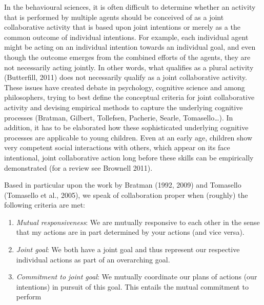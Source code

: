 \documentclass{article}
\begin{document}
In the behavioural sciences, it is often difficult to determine whether an
activity that is performed by multiple agents should be conceived of as a joint
collaborative activity that is based upon joint intentions or merely as a the
common outcome of individual intentions. For example, each individual agent
might be acting on an individual intention towards an individual goal, and even
though the outcome emerges from the combined efforts of the agents, they are
not necessarily acting jointly. In other words, what qualifies as a plural
activity (Butterfill, 2011) does not necessarily qualify as a joint
collaborative activity. These issues have created
debate in psychology, cognitive science and among philosophers, trying to best
define the conceptual criteria for joint collaborative activity and devising
empirical methods to capture the underlying cognitive processes (Bratman,
Gilbert, Tollefsen, Pacherie, Searle, Tomasello{\dots}). In addition, it has to
be elaborated how these sophisticated underlying cognitive processes are
applicable to young children. Even at an early age, children show very
competent social interactions with others, which appear on its face
intentional, joint collaborative action long before these skills can be
empirically demonstrated (for a review see Brownell 2011). 

Based in particular upon the work by Bratman (1992, 2009) and
Tomasello (Tomasello et al., 2005), we speak of collaboration proper when
(roughly) the following criteria are met:

\begin{enumerate}

\item{\it Mutual responsiveness}: We are mutually responsive to each other
in the sense that my actions are in part determined by your actions (and vice
versa).

\item{\it Joint goal}: We both have a joint goal and thus represent our
respective individual actions as part of an overarching goal.

\item{\it Commitment to joint goal}: We mutually coordinate our plans of
actions (our intentions) in pursuit of this goal. This entails the mutual
commitment to perform 

\end{enumerate}
\end{document}
